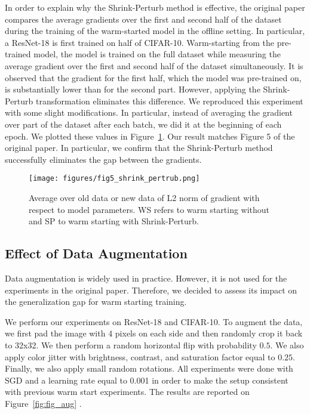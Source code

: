 In order to explain why the Shrink-Perturb method is effective, the original paper compares the average gradients over the first and second half of the dataset during the training of the warm-started model in the offline setting. In particular, a ResNet-18 is first trained on half of CIFAR-10. Warm-starting from the pre-trained model, the model is trained on the full dataset while measuring the average gradient over the first and second half of the dataset simultaneously.  It is observed that the gradient for the first half, which the model was pre-trained on, is substantially lower than for the second part. However, applying the Shrink-Perturb transformation eliminates this difference. We reproduced this experiment with some slight modifications. In particular, instead of averaging the gradient over part of the dataset after each batch, we did it at the beginning of each epoch. We plotted these values in Figure~\ref{fig:fig5-sp}. Our result matches Figure 5 of the original paper. In particular, we confirm that the Shrink-Perturb method successfully eliminates the gap between the gradients.

\begin{figure}
\begin{minipage}[t]{\linewidth}
    \texttt{[image: figures/fig5\_shrink\_pertrub.png]}
    \caption{Average over old data or new data of L2 norm of gradient with respect to model parameters. WS refers to warm starting without and SP to warm starting with Shrink-Perturb.}
    \label{fig:fig5-sp}
\end{minipage}
\end{figure}


\subsection{Effect of Data Augmentation}
\label{sec:data-augmentation}

Data augmentation is widely used in practice. However, it is not used for the experiments in the original paper. Therefore, we decided to assess its impact on the generalization gap for warm starting training.

%
 We perform our experiments on ResNet-18 and CIFAR-10. To augment the data, we first pad the image with 4 pixels on each side and then randomly crop it back to 32x32. We then perform a random horizontal flip with probability $0.5$. We also apply color jitter with brightness, contrast, and saturation factor equal to $0.25$. Finally, we also apply small random rotations. All experiments were done with SGD and a learning rate equal to 0.001 in order to make the setup consistent with previous warm start experiments. The results are reported on Figure~\ref{fig:fig_aug} . 

